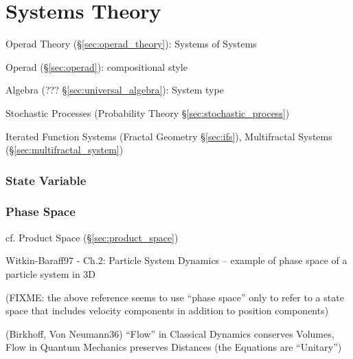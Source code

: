 \part{Systems Theory}\label{sec:systems_theory}


Operad Theory (\S\ref{sec:operad_theory}): Systems of Systems

Operad (\S\ref{sec:operad}): compositional style

Algebra (??? \S\ref{sec:universal_algebra}): System type

Stochastic Processes (Probability Theory \S\ref{sec:stochastic_process})

Iterated Function Systems (Fractal Geometry \S\ref{sec:ifs}), Multifractal
Systems (\S\ref{sec:multifractal_system})



\section{State Variable}\label{sec:state_variable}

\section{Phase Space}\label{sec:phase_space}

cf. Product Space (\S\ref{sec:product_space})

Witkin-Baraff97 - Ch.2: Particle System Dynamics -- example of phase space of a
particle system in 3D

(FIXME: the above reference seems to use ``phase space'' only to refer to a
state space that includes velocity components in addition to position
components)

(Birkhoff, Von Neumann36) ``Flow'' in Classical Dynamics conserves Volumes, Flow
in Quantum Mechanics preserves Distances (the Equations are ``Unitary'')

